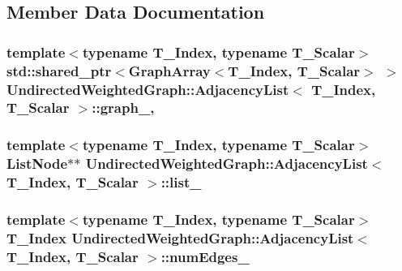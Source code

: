 \subsection{Member Data Documentation}
\hypertarget{class_undirected_weighted_graph_1_1_adjacency_list_a9fa1388a2f0ec3c1428da65604290bdf}{
\subsubsection[{graph\+\_\+}]{\setlength{\rightskip}{0pt plus 5cm}template$<$typename T\+\_\+\+Index, typename T\+\_\+\+Scalar$>$ std\+::shared\+\_\+ptr$<${\bf Graph\+Array}$<$T\+\_\+\+Index, T\+\_\+\+Scalar$>$ $>$ {\bf Undirected\+Weighted\+Graph\+::\+Adjacency\+List}$<$ T\+\_\+\+Index, T\+\_\+\+Scalar $>$\+::graph\+\_\+\hspace{0.3cm}{\ttfamily [mutable]}, {\ttfamily [private]}}}\label{class_undirected_weighted_graph_1_1_adjacency_list_a9fa1388a2f0ec3c1428da65604290bdf}
\hypertarget{class_undirected_weighted_graph_1_1_adjacency_list_a6e46162121cb122f3ba430c7a2528cac}{
\subsubsection[{list\+\_\+}]{\setlength{\rightskip}{0pt plus 5cm}template$<$typename T\+\_\+\+Index, typename T\+\_\+\+Scalar$>$ {\bf List\+Node}$\ast$$\ast$ {\bf Undirected\+Weighted\+Graph\+::\+Adjacency\+List}$<$ T\+\_\+\+Index, T\+\_\+\+Scalar $>$\+::list\+\_\+\hspace{0.3cm}{\ttfamily [private]}}}\label{class_undirected_weighted_graph_1_1_adjacency_list_a6e46162121cb122f3ba430c7a2528cac}
\hypertarget{class_undirected_weighted_graph_1_1_adjacency_list_a383bf107a02d24417f668c9cb175959f}{
\subsubsection[{num\+Edges\+\_\+}]{\setlength{\rightskip}{0pt plus 5cm}template$<$typename T\+\_\+\+Index, typename T\+\_\+\+Scalar$>$ T\+\_\+\+Index {\bf Undirected\+Weighted\+Graph\+::\+Adjacency\+List}$<$ T\+\_\+\+Index, T\+\_\+\+Scalar $>$\+::num\+Edges\+\_\+\hspace{0.3cm}{\ttfamily [private]}}}\label{class_undirected_weighted_graph_1_1_adjacency_list_a383bf107a02d24417f668c9cb175959f}
